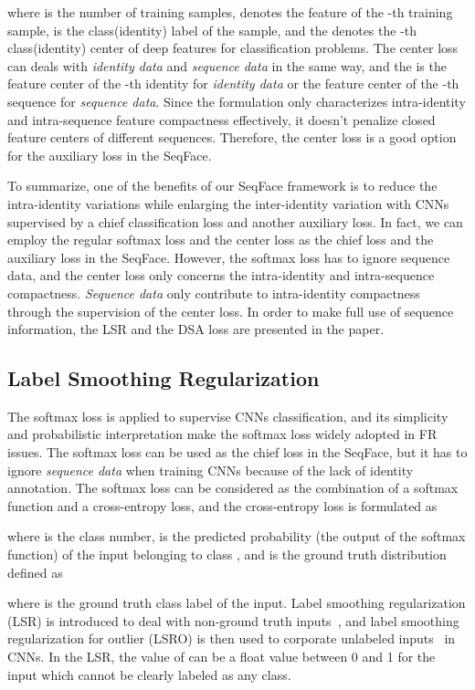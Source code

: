 \documentclass[conference]{acmsiggraph}
\begin{document}
where  is the number of training samples,  denotes the feature of the -th training sample,  is the class(identity) label of the sample, and the  denotes the -th class(identity) center of deep features for classification problems. The center loss can deals with \emph{identity data} and \emph{sequence data} in the same way, and the  is the feature center of the -th identity for \emph{identity data} or the feature center of the -th sequence for \emph{sequence data}. Since the formulation only characterizes intra-identity and intra-sequence feature compactness effectively, it doesn't penalize closed feature centers of different sequences. Therefore, the center loss is a good option for the auxiliary loss in the SeqFace.

To summarize, one of the benefits of our SeqFace framework is to reduce the intra-identity variations while enlarging the inter-identity variation with CNNs supervised by a chief classification loss and another auxiliary loss. In fact, we can employ the regular softmax loss and the center loss as the chief loss and the auxiliary loss in the SeqFace. However, the softmax loss has to ignore sequence data, and the center loss only concerns the intra-identity and intra-sequence compactness. \emph{Sequence data} only contribute to intra-identity compactness through the supervision of the center loss. In order to make full use of sequence information, the LSR and the DSA loss are presented in the paper.

\subsection{Label Smoothing Regularization}
\label{sec::ssoftmax}

The softmax loss is applied to supervise CNNs classification, and its simplicity and probabilistic interpretation make the softmax loss widely adopted in FR issues. The softmax loss can be used as the chief loss in the SeqFace, but it has to ignore \emph{sequence data} when training CNNs because of the lack of identity annotation. The softmax loss can be considered as the combination of a softmax function and a cross-entropy loss, and the cross-entropy loss is formulated as

where  is the class number,  is the predicted probability (the output of the softmax function) of the input belonging to class , and  is the ground truth distribution defined as

where  is the ground truth class label of the input. Label smoothing regularization (LSR) is introduced to deal with non-ground truth inputs~\cite{lsr}, and label smoothing regularization for outlier (LSRO) is then used to corporate unlabeled inputs~\cite{lsro} in CNNs. In the LSR, the value of  can be a float value between 0 and 1 for the input which cannot be clearly labeled as any class.
\end{document}
